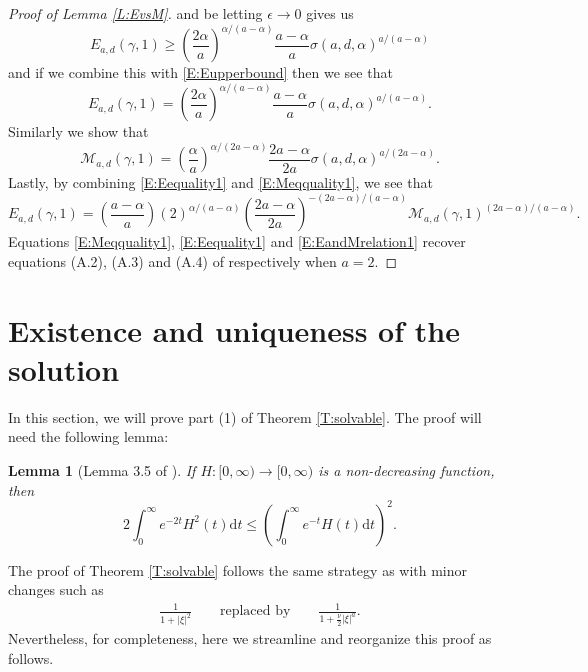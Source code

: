 \documentclass[12pt]{report}
\theoremstyle{plain}
\newtheorem{lemma}[theorem]{Lemma}
\theoremstyle{definition}
\numberwithin{equation}{section}
\newcommand{\ud}{\ensuremath{ \mathrm{d} }}
\begin{document}
\begin{proof}[Proof of Lemma \ref{L:EvsM}]
	and be letting $\epsilon \to 0$ gives us
	\begin{equation}\label{E:Elowerbound}
	E_{a,d}(\gamma,1) \ge\left(\frac{2\alpha}{a}\right)^{\alpha/(a-\alpha)}\frac{a-\alpha}{a}\sigma(a,d,\alpha)^{a/(a-\alpha)}
	\end{equation}
	and if we combine this with \eqref{E:Eupperbound} then we see that
	\begin{equation}\label{E:Eequality1}
	E_{a,d}(\gamma,1) = \left(\frac{2\alpha}{a}\right)^{\alpha/(a-\alpha)}\frac{a-\alpha}{a}\sigma(a,d,\alpha)^{a/(a-\alpha)}.
	\end{equation}
	Similarly we show that
	\begin{equation}\label{E:Meqquality1}
	\mathcal{M}_{a,d}(\gamma,1) = \left( \frac{\alpha}{a}\right)^{\alpha/(2a-\alpha)} \frac{2a-\alpha}{2a}\sigma(a,d,\alpha)^{a/(2a-\alpha)}.
	\end{equation}
	Lastly, by combining \eqref{E:Eequality1} and \eqref{E:Meqquality1}, we see that
	\begin{equation} \label{E:EandMrelation1}
	E_{a,d}(\gamma,1) = \left( \frac{a-\alpha}{a}\right)(2)^{\alpha/(a-\alpha)}\left( \frac{2a-\alpha}{2a} \right)^{-(2a-\alpha)/(a-\alpha)}\mathcal{M}_{a,d}(\gamma,1)^{(2a-\alpha)/(a-\alpha)} .
	\end{equation}
	Equations \eqref{E:Meqquality1}, \eqref{E:Eequality1} and \eqref{E:EandMrelation1} recover
	equations (A.2), (A.3) and (A.4) of \cite{chen.hu.ea:15:exponential} respectively when $a=2$.
\end{proof}

\section{Existence and uniqueness of the solution} \label{S:solvable}

In this section, we will prove part (1) of Theorem \ref{T:solvable}. The proof will need the
following lemma:

\begin{lemma}[Lemma 3.5 of \cite{balan.chen.ea:22:exact}] \label{L:doubleExp}
	If $H:[0,\infty) \to [0,\infty)$ is a non-decreasing function, then
	\begin{equation} \label{E:doubleExp}
	2\int_0^\infty e^{-2t}H^2(t) \ud t \le \left( \int_0^\infty e^{-t} H(t) \ud t \right)^2.
	\end{equation}
\end{lemma}

The proof of Theorem \ref{T:solvable} follows the same strategy as \cite[Section 3]{balan.chen.ea:22:exact} with
minor changes such as
\begin{align} \label{E:Changes}
\frac{1}{1+|\xi|^2} \qquad \text{replaced by} \qquad \frac{1}{1+\frac{\nu}{2}|\xi|^a}.
\end{align}
Nevertheless, for completeness, here we streamline and reorganize this proof as follows.
\end{document}
